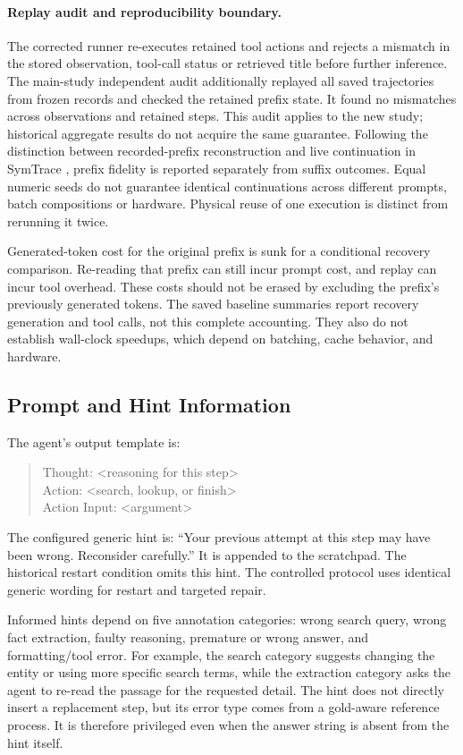 \documentclass{article}
\begin{document}
\paragraph{Replay audit and reproducibility boundary.}
The corrected runner re-executes retained tool actions and rejects a
mismatch in the stored observation, tool-call status or retrieved title
before further inference. The main-study independent audit additionally
replayed all saved trajectories from frozen records and checked the retained
prefix state. It found no mismatches across \MainObservations{} observations
and \MainPrefixes{} retained steps. This audit applies to the new study;
historical aggregate results do not acquire the same guarantee.
Following the distinction between recorded-prefix reconstruction and live
continuation in SymTrace \citep{luan2026symtrace}, prefix fidelity is reported
separately from suffix outcomes. Equal numeric seeds do not guarantee
identical continuations across different prompts, batch compositions or
hardware. Physical reuse of one execution is distinct from rerunning it twice.

Generated-token cost for the original prefix is sunk for a conditional
recovery comparison. Re-reading that prefix can still incur prompt cost,
and replay can incur tool overhead. These costs should not be erased by
excluding the prefix's previously generated tokens. The saved baseline
summaries report recovery generation and tool calls, not this complete
accounting. They also do not establish wall-clock speedups, which depend
on batching, cache behavior, and hardware.

\subsection{Prompt and Hint Information}
The agent's output template is:
\begin{quote}\ttfamily
Thought: <reasoning for this step>\\
Action: <search, lookup, or finish>\\
Action Input: <argument>
\end{quote}
The configured generic hint is: ``Your previous attempt at this step may
have been wrong. Reconsider carefully.'' It is appended to the scratchpad.
The historical restart condition omits this hint. The controlled protocol
uses identical generic wording for restart and targeted repair.

Informed hints depend on five annotation categories: wrong search query,
wrong fact extraction, faulty reasoning, premature or wrong answer, and
formatting/tool error. For example, the search category suggests changing
the entity or using more specific search terms, while the extraction
category asks the agent to re-read the passage for the requested detail.
The hint does not directly insert a replacement step, but its error type
comes from a gold-aware reference process. It is therefore privileged even
when the answer string is absent from the hint itself.
\end{document}
